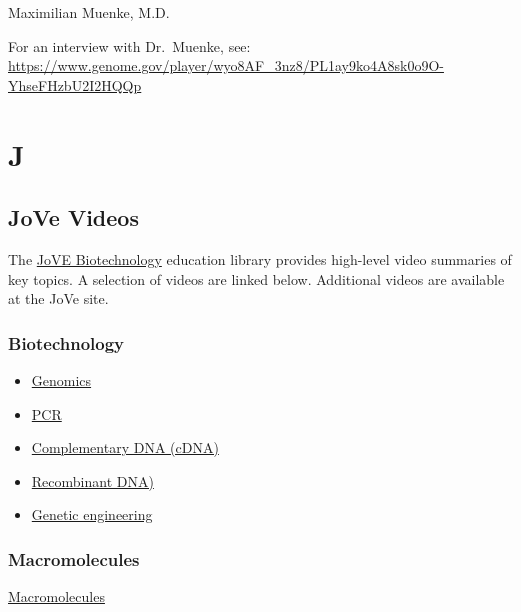 \documentclass[
]{book}
\providecommand{\tightlist}{%
  \setlength{\itemsep}{0pt}\setlength{\parskip}{0pt}}
\begin{document}
Maximilian Muenke, M.D.

For an interview with Dr.~Muenke, see: \url{https://www.genome.gov/player/wyo8AF_3nz8/PL1ay9ko4A8sk0o9O-YhseFHzbU2I2HQQp}

\hypertarget{j}{%
\chapter{J}\label{j}}

\hypertarget{jove-videos}{%
\section{JoVe Videos}\label{jove-videos}}

The \href{https://www.jove.com/science-education-library/59/biotechnology}{JoVE Biotechnology} education library provides high-level video summaries of key topics. A selection of videos are linked below. Additional videos are available at the JoVe site.

\hypertarget{biotechnology}{%
\subsection{Biotechnology}\label{biotechnology}}

\begin{itemize}
\tightlist
\item
  \href{https://www.jove.com/science-education/11122/genomics}{Genomics}
\item
  \href{https://www.jove.com/science-education/10819/pcr}{PCR}
\item
  \href{https://www.jove.com/science-education/10818/complementary-dna}{Complementary DNA (cDNA)}
\item
  \href{https://www.jove.com/science-education/10808/recombinant-dna}{Recombinant DNA)}
\item
  \href{https://www.jove.com/science-education/10806/what-is-genetic-engineering}{Genetic engineering}
\end{itemize}

\hypertarget{macromolecules}{%
\subsection{Macromolecules}\label{macromolecules}}

\href{https://www.jove.com/science-education-library/45/macromolecules}{Macromolecules}
\end{document}
